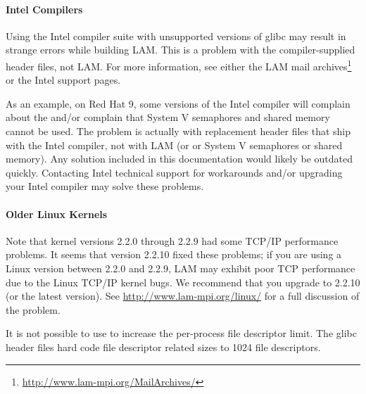 \paragraph{Intel Compilers}


Using the Intel compiler suite with unsupported versions of glibc may
result in strange errors while building LAM.  This is a problem with
the compiler-supplied header files, not LAM.  For more information,
see either the LAM mail
archives\footnote{\url{http://www.lam-mpi.org/MailArchives/}} or the
Intel support pages.  


As an example, on Red Hat 9, some versions of the Intel compiler will
complain about the  and/or complain that System V
semaphores and shared memory cannot be used.  The problem is actually
with replacement header files that ship with the Intel compiler, not
with LAM (or  or System V semaphores or shared
memory).  Any solution included in this documentation would likely be
outdated quickly.  Contacting Intel technical support for workarounds
and/or upgrading your Intel compiler may solve these problems.


\paragraph{Older Linux Kernels}

Note that kernel versions 2.2.0 through 2.2.9 had some TCP/IP
performance problems.  It seems that version 2.2.10 fixed these
problems; if you are using a Linux version between 2.2.0 and 2.2.9,
LAM may exhibit poor TCP performance due to the Linux TCP/IP kernel
bugs.  We recommend that you upgrade to 2.2.10 (or the latest
version).
See \url{http://www.lam-mpi.org/linux/} for a full discussion of the
problem.

It is not possible to use  to increase the
per-process file descriptor limit.  The glibc header files hard code
file descriptor related sizes to 1024 file descriptors.




